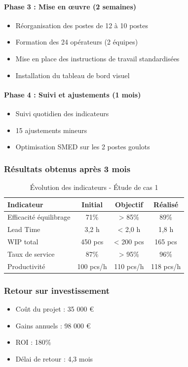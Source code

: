 \documentclass[12pt,a4paper]{article}
\begin{document}
\begin{center}
\paragraph{Phase 3 : Mise en œuvre (2 semaines)}
\begin{itemize}
    \item Réorganisation des postes de 12 à 10 postes
    \item Formation des 24 opérateurs (2 équipes)
    \item Mise en place des instructions de travail standardisées
    \item Installation du tableau de bord visuel
\end{itemize}

\paragraph{Phase 4 : Suivi et ajustements (1 mois)}
\begin{itemize}
    \item Suivi quotidien des indicateurs
    \item 15 ajustements mineurs
    \item Optimisation SMED sur les 2 postes goulots
\end{itemize}

\subsubsection{Résultats obtenus après 3 mois}

\begin{table}[H]
\centering
\caption{Évolution des indicateurs - Étude de cas 1}
\label{tab:cas1_resultats}
\begin{tabular}{|l|c|c|c|}
\hline
\textbf{Indicateur} & \textbf{Initial} & \textbf{Objectif} & \textbf{Réalisé} \\ \hline
Efficacité équilibrage & 71\% & > 85\% & 89\% \\
Lead Time & 3,2 h & < 2,0 h & 1,8 h \\
WIP total & 450 pcs & < 200 pcs & 165 pcs \\
Taux de service & 87\% & > 95\% & 96\% \\
Productivité & 100 pcs/h & 110 pcs/h & 118 pcs/h \\
\hline
\end{tabular}
\end{table}

\subsubsection{Retour sur investissement}
\begin{itemize}
    \item Coût du projet : 35 000 €
    \item Gains annuels : 98 000 €
    \item ROI : 180\%
    \item Délai de retour : 4,3 mois
\end{itemize}


\end{center}
\end{document}
